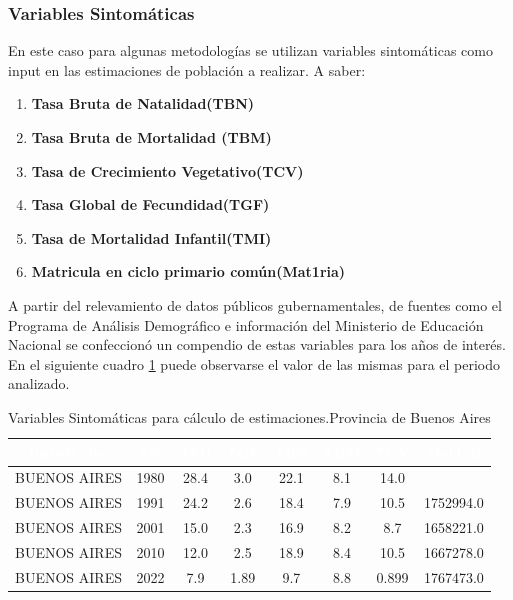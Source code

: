 \documentclass{article}
\theoremstyle{mytheoremstyle}
\theoremstyle{mytheoremstyle}
\theoremstyle{myproblemstyle}
\begin{document}
\subsubsection{Variables Sintomáticas}
En este caso para algunas metodologías se utilizan variables sintomáticas como input en las
 estimaciones de población a realizar. A saber:
 \begin{enumerate}
    \item \textbf{Tasa Bruta de Natalidad(TBN)}
    \item	\textbf{Tasa Bruta de Mortalidad (TBM)}
    \item \textbf{Tasa de Crecimiento Vegetativo(TCV)}
    \item \textbf{Tasa Global de Fecundidad(TGF)}
    \item \textbf{Tasa de Mortalidad Infantil(TMI)} 
    \item \textbf{Matricula en ciclo primario común(Mat1ria)} 
  \end{enumerate}
 
A partir del relevamiento de datos públicos gubernamentales,
de fuentes como el  Programa de Análisis Demográfico e 
información del Ministerio de Educación Nacional  se confeccionó 
un compendio de estas variables para los años de interés.
En el siguiente cuadro \ref{tab:TasasBA} puede observarse el valor de las mismas
para el periodo analizado.\newline
 
\begin{table}[htb] %
  \centering
  \begin{tabular}{|c|c|c|c|c|c|c|c|}
  \hline
  \textbf{\cellcolor[rgb]{0,0.231,0.427}\textcolor{white}{Jurisdiccion}} & \textbf{\cellcolor[rgb]{0,0.231,0.427}\textcolor{white}{Año}} & \textbf{\cellcolor[rgb]{0,0.231,0.427}\textcolor{white}{TMI}} & \textbf{\cellcolor[rgb]{0,0.231,0.427}\textcolor{white}{TGF}} & \textbf{\cellcolor[rgb]{0,0.231,0.427}\textcolor{white}{TBN}} & \textbf{\cellcolor[rgb]{0,0.231,0.427}\textcolor{white}{TBM}} & \textbf{\cellcolor[rgb]{0,0.231,0.427}\textcolor{white}{TCV}} & \textbf{\cellcolor[rgb]{0,0.231,0.427}\textcolor{white}{Mat1ria}} \\ \hline
  BUENOS AIRES & 1980 & 28.4 & 3.0 & 22.1 & 8.1 & 14.0 &  \\
  BUENOS AIRES & 1991 & 24.2 & 2.6 & 18.4 & 7.9 & 10.5 & 1752994.0 \\
  BUENOS AIRES & 2001 & 15.0 & 2.3 & 16.9 & 8.2 & 8.7 & 1658221.0 \\
  BUENOS AIRES & 2010 & 12.0 & 2.5 & 18.9 & 8.4 & 10.5 & 1667278.0 \\
  BUENOS AIRES & 2022 & 7.9 & 1.89 & 9.7 & 8.8 & 0.899 & 1767473.0 \\
  \hline
  \end{tabular}
  \caption{Variables Sintomáticas para cálculo de estimaciones.Provincia de Buenos Aires}
  \label{tab:TasasBA}
  \end{table}
  
\end{document}
